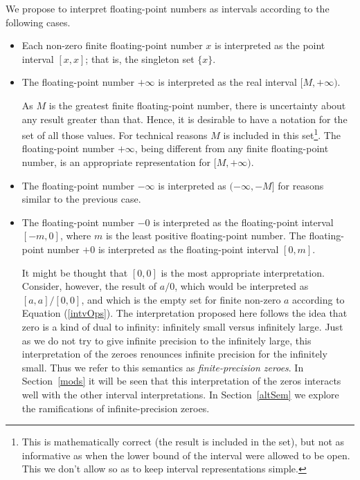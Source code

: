 \documentclass[11pt]{article}
\begin{document}
We propose to interpret floating-point numbers as intervals according
to the following cases.
\begin{itemize}

\item Each non-zero finite floating-point number $x$ is interpreted as
  the point interval $[x,x]$; that is, the singleton set
  $\{x\}$.

\item The floating-point number $+\infty$ is interpreted as the real
  interval $[M,+\infty)$.

  As $M$ is the greatest finite floating-point number, there is
  uncertainty about any result greater than that.  Hence, it is
  desirable to have a notation for the set of all those values. For
  technical reasons $M$ is included in this set\footnote{
This is mathematically correct (the result is included in the set),
but not as informative as when the lower bound of the interval were
allowed to be open. This we don't allow so as to keep interval
representations simple.}.
The floating-point
  number $+\infty$, being different from any finite floating-point
  number, is an appropriate representation for $[M,+\infty)$.

\item The floating-point number $-\infty$ is interpreted as
  $(-\infty,-M]$ for reasons similar to the previous case.

\item The floating-point number $-0$ is interpreted as the
  floating-point interval $[-m,0]$, where $m$ is the least positive
  floating-point number.  The floating-point number $+0$ is
  interpreted as the floating-point interval $[0,m]$.

  It might be thought that $[0,0]$ is the most appropriate
  interpretation. Consider, however, the result of $a/0$, which would
  be interpreted as $[a,a]/[0,0]$, and which is the empty set for
  finite non-zero $a$ according to Equation (\ref{intvOps}).  The
  interpretation proposed here follows the idea that zero is a kind of
  dual to infinity: infinitely small versus infinitely large. Just as
  we do not try to give infinite precision to the infinitely large,
  this interpretation of the zeroes renounces infinite precision for
  the infinitely small. Thus we refer to this semantics as
  \emph{finite-precision zeroes}.  In Section~\ref{mods} it will be
  seen that this interpretation of the zeros interacts well with the
  other interval interpretations.  In Section~\ref{altSem} we explore
  the ramifications of infinite-precision zeroes.
\end{itemize}
\end{document}
